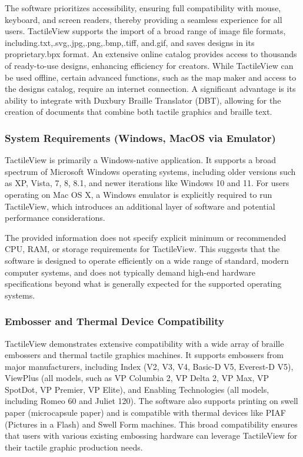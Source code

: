 The software prioritizes accessibility, ensuring full compatibility with mouse, keyboard, and screen readers, thereby providing a seamless experience for all users.\cite{DuxburyDetails,BlindSVG} TactileView supports the import of a broad range of image file formats, including.txt,.svg,.jpg,.png,.bmp,.tiff, and.gif, and saves designs in its proprietary.bpx format.\cite{DuxburyDetails,BlindSVG,DuxburyNews} An extensive online catalog provides access to thousands of ready-to-use designs, enhancing efficiency for creators.\cite{DuxburyDetails,BlindSVG,DuxburyNews} While TactileView can be used offline, certain advanced functions, such as the map maker and access to the designs catalog, require an internet connection.\cite{DuxburyDetails,BlindSVG,DuxburyNews} A significant advantage is its ability to integrate with Duxbury Braille Translator (DBT), allowing for the creation of documents that combine both tactile graphics and braille text.\cite{DuxburyDetails}

\subsubsection{System Requirements (Windows, MacOS via Emulator)}

TactileView is primarily a Windows-native application. It supports a broad spectrum of Microsoft Windows operating systems, including older versions such as XP, Vista, 7, 8, 8.1, and newer iterations like Windows 10 and 11.\cite{DuxburyDetails,BlindSVG,DuxburyNews} For users operating on Mac OS X, a Windows emulator is explicitly required to run TactileView, which introduces an additional layer of software and potential performance considerations.\cite{DuxburyDetails,BlindSVG,DuxburyNews}

The provided information does not specify explicit minimum or recommended CPU, RAM, or storage requirements for TactileView.\cite{DuxburyDetails,BlindSVG,DuxburyNews} This suggests that the software is designed to operate efficiently on a wide range of standard, modern computer systems, and does not typically demand high-end hardware specifications beyond what is generally expected for the supported operating systems.

\subsubsection{Embosser and Thermal Device Compatibility}

TactileView demonstrates extensive compatibility with a wide array of braille embossers and thermal tactile graphics machines. It supports embossers from major manufacturers, including Index (V2, V3, V4, Basic-D V5, Everest-D V5), ViewPlus (all models, such as VP Columbia 2, VP Delta 2, VP Max, VP SpotDot, VP Premier, VP Elite), and Enabling Technologies (all models, including Romeo 60 and Juliet 120).\cite{DuxburyDetails,BlindSVG} The software also supports printing on swell paper (microcapsule paper) and is compatible with thermal devices like PIAF (Pictures in a Flash) and Swell Form machines.\cite{DuxburyDetails} This broad compatibility ensures that users with various existing embossing hardware can leverage TactileView for their tactile graphic production needs.

